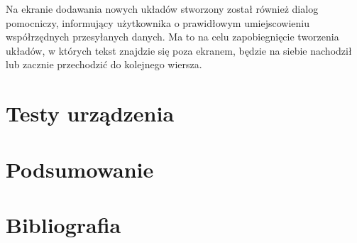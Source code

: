 \documentclass[a4paper,12pt, twoside]{article}
\begin{document}
    	
    	Na ekranie dodawania nowych układów stworzony został również dialog pomocniczy, informujący użytkownika o prawidłowym umiejscowieniu współrzędnych przesyłanych danych. Ma to na celu zapobiegnięcie tworzenia układów, w których tekst znajdzie się poza ekranem, będzie na siebie nachodził lub zacznie przechodzić do kolejnego wiersza.
    	
    	
    	
    	
    	
    	
    	
    	
    	
    	
    	
    	\section{Testy urządzenia}
    	
    	\section{Podsumowanie}
    	
    	\newpage
    	\section{Bibliografia}
    	
\end{document}
